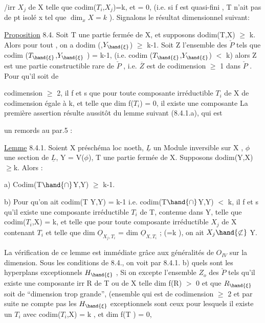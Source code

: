 /irr $X_j$ de X telle que codim($T_i$,$X_j$)=k, et  = 0, (i.e. si f est quasi-fini ,  T n'ait pas de pt isolé x tel que $\dim_x X = k$ ).
Signalons le résultat dimensionnel suivant:

\uline{Proposition} 8.4. Soit T une partie fermée de X, et supposons
dodim(T,X) $\geq$ k. Alors pour tout , on a dodim (,$Y_{\hand{\xi}}$) $\geq$ k-1. Soit
Z l'ensemble des \hand{$\xi\in$} $\check{P}$ tels que codim ($T_{\hand{\xi}}$,$Y_{\hand{\xi}}$ ) = k-1, (i.e.
codim ($T_{\hand{\xi}}$,$Y_{\hand{\xi}}$) $<$ k) alors Z est une partie constructible rare de $\check{P}$ ,
i.e. $\overline{Z}$ est de codimension $\geq$ 1 dans $\check{P}$ . Pour qu'il soit de

codimension $\geq$ 2, il f et s que pour toute composante irréductible
$T_i$ de X de codimension égale à k,  et telle 
que dim f($T_i$) = 0, il existe une composante \hand{/}
La première assertion résulte aussitôt du lemme suivant (8.4.1.a), qui est

un remords au par.5 :

\uline{Lemme} 8.4.1. Soient X préschéma loc noeth, $\underline{L}$ un Module inversible sur
X , $\phi$ une section de $\underline{L}$, Y = V($\phi$), T une partie fermée de X. Supposons dodim(Y,X)$\geq$k. Alors :

a) Codim(T$\hand{\cap}$Y,Y) $\geq$ k-1.

b) Pour qu'on ait codim(T Y,Y) = k-1 i.e. codim(T$\hand{\cap}$Y,Y) $<$ k, il
f et s qu'il existe une composante irréductible $T_i$ de T, contenue dans
Y,  telle que codim($T_i$,X) = k, et telle que pour toute composante
irréductible $X_j$ de X  contenant $T_i$ et telle que dim $\underline{O}_{X_j,T_i}$ =
dim $\underline{O}_{X,T_i}$ ; (=k ), on ait $X_j \hand{\not\subset}$ Y.

La vérification de ce lemme est immédiate grâce aux généralités
de $O_{IV}$ sur la dimension. Sous les conditions de 8.4., on voit par 8.4.1. b) quels sont
les hyperplans exceptionnels $H_{\hand{\xi}}$ 
, Si
on excepte l'ensemble $Z_o$ des \hand{$\xi\in$} $\check{P}$ tels qu'il existe une composante
irr R de T ou de X telle dim f(R) $>$ 0 et que $R_{\hand{\xi}}$ soit de ``dimension trop grande'',
 (ensemble qui est de codimension $\geq$ 2 et par suite ne compte pas
les $H_{\hand{\xi}}$  exceptionnels sont ceux pour lesquels il existe
un $T_i$ avec codim($T_i$,X) = k , et  dim f(T ) = 0,

